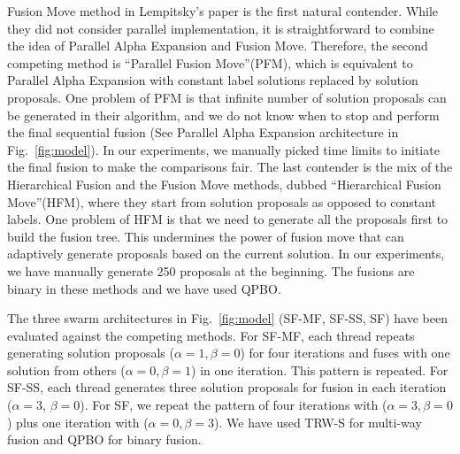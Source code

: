 \noindent Fusion Move method in Lempitsky's paper is the first natural
contender. While they did not consider parallel implementation, it is
straightforward to combine the idea of Parallel Alpha Expansion and
Fusion Move. Therefore, the second competing method is ``Parallel Fusion
Move''(PFM), which is equivalent to Parallel Alpha Expansion with constant
label solutions replaced by solution proposals.
%
One problem of PFM is that infinite number of solution proposals can be
generated in their algorithm, and we do not know when to stop and
perform the final sequential fusion (See Parallel Alpha Expansion
architecture in Fig.~\ref{fig:model}). In our experiments, we manually
picked time limits to initiate the final fusion to make the comparisons
fair.
%
The last contender is the mix of the Hierarchical Fusion and the Fusion
Move methods, dubbed ``Hierarchical Fusion Move''(HFM), where they
start from solution proposals as opposed to constant labels. One problem
of HFM is that we need to generate all the proposals first to build the
fusion tree. This undermines the power of fusion move that can
adaptively generate proposals based on the current solution. In our
experiments, we have manually generate 250 proposals at the
beginning.
The fusions are binary in these methods and we have used QPBO.


\noindent
The three swarm architectures in Fig.~\ref{fig:model} (SF-MF, SF-SS,
SF) have been evaluated against the competing methods. For SF-MF, each
thread repeats generating solution proposals ($\alpha=1, \beta=0$) for
four iterations and fuses with one solution from others ($\alpha=0,
\beta=1$) in one iteration. This pattern is repeated. For SF-SS, each
thread generates three solution proposals for fusion in each iteration
($\alpha=3$, $\beta=0$). For SF, we repeat the pattern of four
iterations with ($\alpha=3, \beta=0$) plus one iteration with ($\alpha=0,
\beta=3$).
We have used TRW-S for multi-way fusion and QPBO for binary fusion.
%
%
